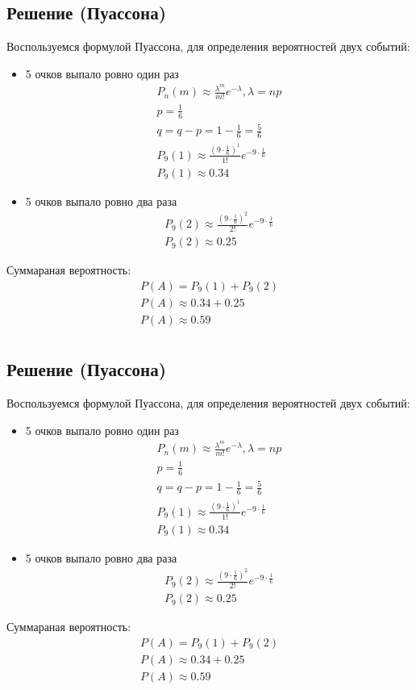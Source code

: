 \documentclass[12pt]{article}
\begin{document}
\subsection*{Решение (Пуассона)}
Воспользуемся формулой Пуассона, для определения вероятностей двух событий:
\begin{itemize}
	\item 5 очков выпало ровно один раз \\
	      \begin{gather*}
		      P_n(m) \approx \frac{\lambda^m}{m!}e^{-\lambda}, \lambda = np \\
		      p = \frac{1}{6} \\
		      q = q - p = 1 - \frac{1}{6} = \frac{5}{6} \\
		      P_9(1) \approx \frac{(9 \cdot \frac{1}{6})^1}{1!}e^{-9 \cdot \frac{1}{6}} \\
		      P_9(1) \approx 0.34
	      \end{gather*}
	\item 5 очков выпало ровно два раза \\
	      \begin{gather*}
		      P_9(2) \approx \frac{(9 \cdot \frac{1}{6})^2}{2!}e^{-9 \cdot \frac{1}{6}} \\
		      P_9(2) \approx 0.25
	      \end{gather*}
\end{itemize}

Суммараная вероятность:
\begin{gather*}
	P(A) = P_9(1) + P_9(2) \\
	P(A) \approx 0.34 + 0.25 \\
	P(A) \approx 0.59 \\
\end{gather*}

\subsection*{Решение (Пуассона)}
Воспользуемся формулой Пуассона, для определения вероятностей двух событий:
\begin{itemize}
	\item 5 очков выпало ровно один раз \\
	      \begin{gather*}
		      P_n(m) \approx \frac{\lambda^m}{m!}e^{-\lambda}, \lambda = np \\
		      p = \frac{1}{6} \\
		      q = q - p = 1 - \frac{1}{6} = \frac{5}{6} \\
		      P_9(1) \approx \frac{(9 \cdot \frac{1}{6})^1}{1!}e^{-9 \cdot \frac{1}{6}} \\
		      P_9(1) \approx 0.34
	      \end{gather*}
	\item 5 очков выпало ровно два раза \\
	      \begin{gather*}
		      P_9(2) \approx \frac{(9 \cdot \frac{1}{6})^2}{2!}e^{-9 \cdot \frac{1}{6}} \\
		      P_9(2) \approx 0.25
	      \end{gather*}
\end{itemize}

Суммараная вероятность:
\begin{gather*}
	P(A) = P_9(1) + P_9(2) \\
	P(A) \approx 0.34 + 0.25 \\
	P(A) \approx 0.59 \\
\end{gather*}
\end{document}

